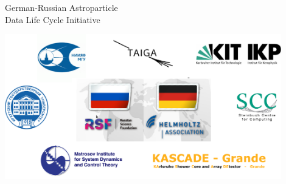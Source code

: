 \begin{frame}{German-Russian Astroparticle \\Data Life Cycle Initiative\footnotemark[1]}
\vspace{-1.4em}
\begin{center}
  \includegraphics[width=0.9\textwidth]{pics/Collab-3.pdf}
\end{center}

\footnotesize{}
\end{frame}

